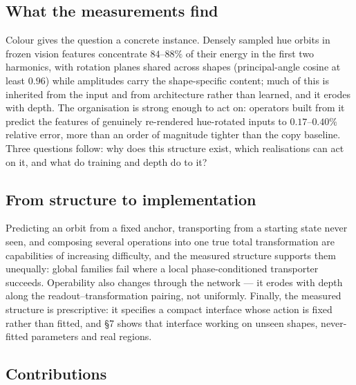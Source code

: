 \subsection{What the measurements find}

Colour gives the question a concrete instance. Densely sampled hue orbits in frozen vision features concentrate $84$--$88\%$ of their energy in the first two harmonics, with rotation planes shared across shapes (principal-angle cosine at least $0.96$) while amplitudes carry the shape-specific content; much of this is inherited from the input and from architecture rather than learned, and it erodes with depth. The organisation is strong enough to act on: operators built from it predict the features of genuinely re-rendered hue-rotated inputs to $0.17$--$0.40\%$ relative error, more than an order of magnitude tighter than the copy baseline. Three questions follow: why does this structure exist, which realisations can act on it, and what do training and depth do to it?

\subsection{From structure to implementation}

Predicting an orbit from a fixed anchor, transporting from a starting state never seen, and composing several operations into one true total transformation are capabilities of increasing difficulty, and the measured structure supports them unequally: global families fail where a local phase-conditioned transporter succeeds. Operability also changes through the network --- it erodes with depth along the readout--transformation pairing, not uniformly. Finally, the measured structure is prescriptive: it specifies a compact interface whose action is fixed rather than fitted, and \S{}7 shows that interface working on unseen shapes, never-fitted parameters and real regions.

\subsection{Contributions}

